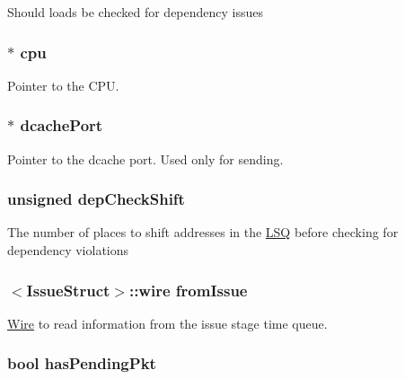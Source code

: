 \label{classLSQUnit_a602a9ccaf8b313e8923d8b07ec5bc439}
Should loads be checked for dependency issues \hypertarget{classLSQUnit_a1379cf882a12ac6fc9eba5da7c84b18b}{
\subsubsection[{cpu}]{$\ast$ {\bf cpu}}}
\label{classLSQUnit_a1379cf882a12ac6fc9eba5da7c84b18b}
Pointer to the CPU. \hypertarget{classLSQUnit_a2bbddd281625b8b4d716708925673445}{
\subsubsection[{dcachePort}]{$\ast$ {\bf dcachePort}}}
\label{classLSQUnit_a2bbddd281625b8b4d716708925673445}
Pointer to the dcache port. Used only for sending. \hypertarget{classLSQUnit_ab5dfaaa13f279adbed7a1eafea047796}{
\subsubsection[{depCheckShift}]{\setlength{\rightskip}{0pt plus 5cm}unsigned {\bf depCheckShift}}}
\label{classLSQUnit_ab5dfaaa13f279adbed7a1eafea047796}
The number of places to shift addresses in the \hyperlink{classLSQ}{LSQ} before checking for dependency violations \hypertarget{classLSQUnit_af6f43373b6586aa8c486538fb076effb}{
\subsubsection[{fromIssue}]{$<${\bf IssueStruct}$>$::wire {\bf fromIssue}}}
\label{classLSQUnit_af6f43373b6586aa8c486538fb076effb}
\hyperlink{classWire}{Wire} to read information from the issue stage time queue. \hypertarget{classLSQUnit_ae4914b6850f06ca3589fe9e75451fc2e}{
\subsubsection[{hasPendingPkt}]{\setlength{\rightskip}{0pt plus 5cm}bool {\bf hasPendingPkt}}}
